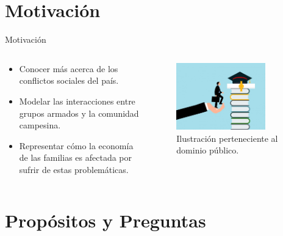 \documentclass[17pt, t, lualatex]{beamer}
\begin{document}
\section{Motivación}

\insertsectionpage

\begin{frame}{Motivación}

  \begin{columns}
    \begin{column}{0.5\textwidth}
      \begin{itemize}
        \item Conocer más acerca de los conflictos sociales del país.
        \item Modelar las interacciones entre grupos armados y la comunidad campesina.
        \item Representar cómo la economía de las familias es afectada por sufrir de estas problemáticas.
      \end{itemize}
    \end{column}

    \begin{column}{0.5\textwidth}
  \begin{figure}[ht]
    \centering
    \includegraphics[width=0.8\textwidth]{img/motivacion.jpg}
    \caption{Ilustración perteneciente al dominio público.}
    \label{fig:6}
  \end{figure}
    \end{column}
  \end{columns}

\end{frame}

\section{Propósitos y Preguntas}
\end{document}

